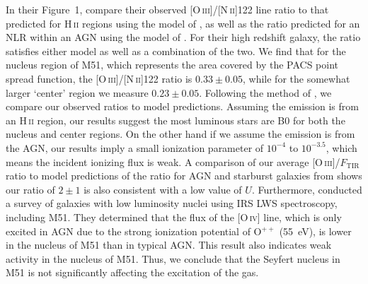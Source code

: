 \documentclass[preprint2]{aastex}
\begin{document}
In their Figure~1, \citet{2011ApJ...740L..29F} compare their observed [O\,\textsc{iii}]/[N\,\textsc{ii}]122 line ratio to that predicted for H\,\textsc{ii} regions using the model of \citet{1985ApJS...57..349R}, as well as the ratio predicted for an NLR within an AGN using the model of \citet{2004ApJS..153....9G}. For their high redshift galaxy, the ratio satisfies either model as well as a combination of the two.  We find that for the nucleus region of M51, which represents the area covered by the PACS point spread function, the [O\,\textsc{iii}]/[N\,\textsc{ii}]122 ratio is $0.33 \pm 0.05$, while for the somewhat larger `center' region we measure $0.23 \pm 0.05$.  Following the method of \citet{2011ApJ...740L..29F}, we compare our observed ratios to model predictions.  Assuming the emission is from an H\,\textsc{ii} region, our results suggest the most luminous stars are B0 \citep{1996ApJ...460..914V} for both the nucleus and center regions.  On the other hand if we assume the emission is from the AGN, our results imply a small ionization parameter of $10^{-4}$ to $10^{-3.5}$, which means the incident ionizing flux is weak.  A comparison of our average [O\,\textsc{iii}]/$F_{\mathrm{TIR}}$ ratio to model predictions of the ratio for AGN and starburst galaxies from \citet{2009ApJ...701.1147A} shows our ratio of $2\pm1$ is also consistent with a low value of $U$.  Furthermore, \citet{2004A&A...414..825S} conducted a survey of galaxies with low luminosity nuclei using IRS LWS spectroscopy, including M51. They determined that the flux of the [O\,\textsc{iv}] line, which is only excited in AGN due to the strong ionization potential of O$^{++}$ (55~eV), is lower in the nucleus of M51 than in typical AGN.  This result also indicates weak activity in the nucleus of M51. Thus, we conclude that the Seyfert nucleus in M51 is not significantly affecting the excitation of the gas.

\end{document}
